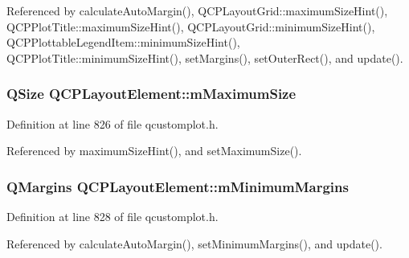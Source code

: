 Referenced by calculate\+Auto\+Margin(), Q\+C\+P\+Layout\+Grid\+::maximum\+Size\+Hint(), Q\+C\+P\+Plot\+Title\+::maximum\+Size\+Hint(), Q\+C\+P\+Layout\+Grid\+::minimum\+Size\+Hint(), Q\+C\+P\+Plottable\+Legend\+Item\+::minimum\+Size\+Hint(), Q\+C\+P\+Plot\+Title\+::minimum\+Size\+Hint(), set\+Margins(), set\+Outer\+Rect(), and update().

\hypertarget{class_q_c_p_layout_element_a64a387973fd4addac842028c89088998}{}
\subsubsection[{m\+Maximum\+Size}]{\setlength{\rightskip}{0pt plus 5cm}Q\+Size Q\+C\+P\+Layout\+Element\+::m\+Maximum\+Size\hspace{0.3cm}{\ttfamily [protected]}}\label{class_q_c_p_layout_element_a64a387973fd4addac842028c89088998}


Definition at line 826 of file qcustomplot.\+h.



Referenced by maximum\+Size\+Hint(), and set\+Maximum\+Size().

\hypertarget{class_q_c_p_layout_element_a5ba71f25d1af4bb092b28df618538e63}{}
\subsubsection[{m\+Minimum\+Margins}]{\setlength{\rightskip}{0pt plus 5cm}Q\+Margins Q\+C\+P\+Layout\+Element\+::m\+Minimum\+Margins\hspace{0.3cm}{\ttfamily [protected]}}\label{class_q_c_p_layout_element_a5ba71f25d1af4bb092b28df618538e63}


Definition at line 828 of file qcustomplot.\+h.



Referenced by calculate\+Auto\+Margin(), set\+Minimum\+Margins(), and update().

\hypertarget{class_q_c_p_layout_element_affef747c81632de33f08483b7fd10d01}{}

